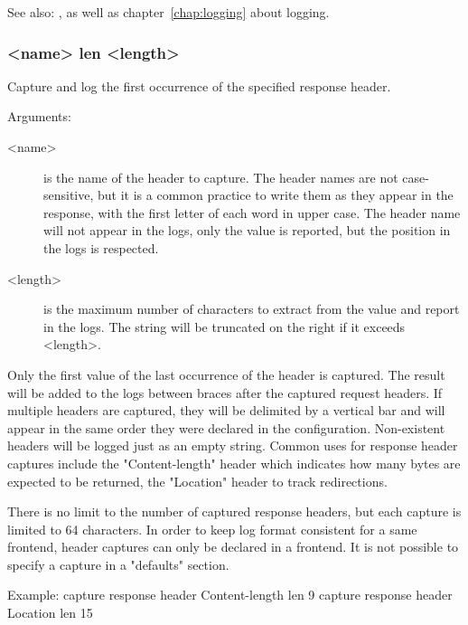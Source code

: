 See also: ,  as well as chapter~\ref{chap:logging}
             about logging.

\subsubsection[capture response header]{ <name> len <length>}

  Capture and log the first occurrence of the specified response header.
  

  Arguments:
  \begin{description}
  \item[<name>]    is the name of the header to capture. The header names are not
              case-sensitive, but it is a common practice to write them as they
              appear in the response, with the first letter of each word in
              upper case. The header name will not appear in the logs, only the
              value is reported, but the position in the logs is respected.

  \item[<length>]  is the maximum number of characters to extract from the value and
              report in the logs. The string will be truncated on the right if
              it exceeds <length>.
  \end{description}

  Only the first value of the last occurrence of the header is captured. The
  result will be added to the logs between braces \chr{\{\}} after the captured
  request headers. If multiple headers are captured, they will be delimited by
  a vertical bar \chr{|} and will appear in the same order they were declared in
  the configuration. Non-existent headers will be logged just as an empty
  string. Common uses for response header captures include the "Content-length"
  header which indicates how many bytes are expected to be returned, the
  "Location" header to track redirections.

  There is no limit to the number of captured response headers, but each
  capture is limited to 64 characters. In order to keep log format consistent
  for a same frontend, header captures can only be declared in a frontend. It
  is not possible to specify a capture in a "defaults" section.

  \begin{example}{Example:}
        capture response header Content-length len 9
        capture response header Location len 15
   \end{example}


